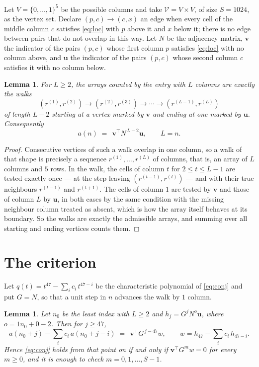 \documentclass[11pt,a4paper]{article}
\theoremstyle{plain}
\newtheorem{lemma}[theorem]{Lemma}
\theoremstyle{definition}
\begin{document}
Let $V=\{0,\dots,1\}^{5}$ be the possible columns and take
$\mathcal V=V\times V$, of size $S=1024$, as the vertex set. Declare $(p,c)\to(c,x)$ an edge
when every cell of the middle column $c$ satisfies \eqref{eq:loc} with $p$ above it and $x$
below it; there is no edge between pairs that do not overlap in this way. Let $N$ be the
adjacency matrix, $\mathbf{v}$ the indicator of the pairs $(p,c)$ whose first column $p$
satisfies \eqref{eq:loc} with no column above, and $\mathbf{u}$ the indicator of
the pairs $(p,c)$ whose second column $c$ satisfies it with no column below.

\begin{lemma}\label{lem:walk}
For $L\ge2$, the arrays counted by the entry with $L$ columns are exactly the walks
\[
(r^{(1)},r^{(2)})\to(r^{(2)},r^{(3)})\to\cdots\to(r^{(L-1)},r^{(L)})
\]
of length $L-2$ starting at a vertex marked by $\mathbf{v}$ and ending at one marked by
$\mathbf{u}$. Consequently
\[
a(n)\;=\;\,\mathbf{v}^{\!\top}N^{\,L-2}\mathbf{u},\qquad L=n .
\]
\end{lemma}

\begin{proof}
Consecutive vertices of such a walk overlap in one column, so a walk of that shape is
precisely a sequence $r^{(1)},\dots,r^{(L)}$ of columns, that is, an array of $L$ columns
and $5$ rows. In the walk, the cells of column $t$ for $2\le t\le L-1$ are tested
exactly once --- at the step leaving $(r^{(t-1)},r^{(t)})$ --- and with their true
neighbours $r^{(t-1)}$ and $r^{(t+1)}$. The cells of column $1$ are tested by
$\mathbf{v}$ and those of column $L$ by $\mathbf{u}$, in both cases by the same condition
with the missing neighbour column treated as absent, which is how the array itself behaves at
its boundary. So the walks are exactly the admissible arrays, and summing over all starting
and ending vertices counts them.
\end{proof}

\section{The criterion}

Let $q(t)=t^{47}-\sum_i c_i\,t^{47-i}$ be the characteristic polynomial of
\eqref{eq:conj} and put $G=N$, so that a unit step in $n$ advances the walk by
$1$ column.

\begin{lemma}\label{lem:crit}
Let $n_0$ be the least index with $L\ge2$ and $h_j=G^{j}N^{o}\mathbf{u}$, where
$o=1n_0+0-2$. Then for $j\ge47$,
\[
a(n_0+j)-\sum_i c_i\,a(n_0+j-i)\;=\;\,\mathbf{v}^{\!\top}G^{\,j-47}w,
\qquad w=h_{47}-\sum_i c_i\,h_{47-i} .
\]
Hence \eqref{eq:conj} holds from that point on if and only if
$\mathbf{v}^{\!\top}G^{m}w=0$ for every $m\ge0$, and it is enough to check
$m=0,1,\dots,S-1$.
\end{lemma}
\end{document}
